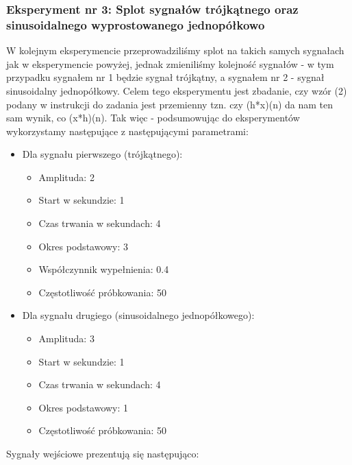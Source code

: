 \documentclass[12pt]{article}
\begin{document}
\subsubsection{Eksperyment nr 3:  Splot sygnałów trójkątnego oraz sinusoidalnego wyprostowanego jednopółkowo}
W kolejnym eksperymencie przeprowadziliśmy splot na takich samych sygnałach jak w eksperymencie powyżej, jednak zmieniliśmy kolejność sygnałów - w tym przypadku sygnałem nr 1 będzie sygnał trójkątny, a sygnałem nr 2 - sygnał sinusoidalny jednopółkowy. Celem tego eksperymentu jest zbadanie, czy wzór (2) podany w instrukcji do zadania \cite{instrukcja} jest przemienny tzn. czy (h*x)(n) da nam ten sam wynik, co (x*h)(n). Tak więc - podsumowując do eksperymentów wykorzystamy następujące z następującymi parametrami:
\begin{itemize}
    \item Dla sygnału pierwszego (trójkątnego):
    \begin{itemize}
        \item Amplituda: 2
        \item Start w sekundzie: 1
        \item Czas trwania w sekundach: 4
        \item Okres podstawowy: 3
        \item Współczynnik wypełnienia: 0.4
        \item Częstotliwość próbkowania: 50
    \end{itemize}
    \item Dla sygnału drugiego (sinusoidalnego jednopółkowego): 
    \begin{itemize}
        \item Amplituda: 3
        \item Start w sekundzie: 1
        \item Czas trwania w sekundach: 4
        \item Okres podstawowy: 1
        \item Częstotliwość próbkowania: 50
    \end{itemize}
\end{itemize}
Sygnały wejściowe prezentują się następująco:
\end{document}
